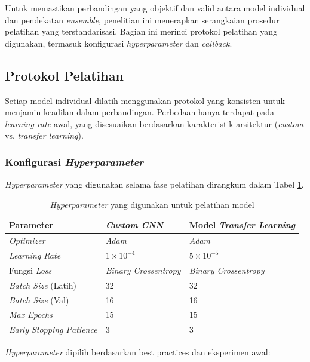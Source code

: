 Untuk memastikan perbandingan yang objektif dan valid antara model individual dan pendekatan \textit{ensemble}, penelitian ini menerapkan serangkaian prosedur pelatihan yang terstandarisasi. Bagian ini merinci protokol pelatihan yang digunakan, termasuk konfigurasi \textit{hyperparameter} dan \textit{callback}.

\subsection{Protokol Pelatihan}

Setiap model individual dilatih menggunakan protokol yang konsisten untuk menjamin keadilan dalam perbandingan. Perbedaan hanya terdapat pada \textit{learning rate} awal, yang disesuaikan berdasarkan karakteristik arsitektur (\textit{custom} vs. \textit{transfer learning}).

\subsubsection{Konfigurasi \textit{Hyperparameter}}
\textit{Hyperparameter} yang digunakan selama fase pelatihan dirangkum dalam Tabel \ref{tab:hyperparameters}.

\begin{table}[h]
\centering
\caption{\textit{Hyperparameter} yang digunakan untuk pelatihan model}
\label{tab:hyperparameters}
\begin{tabular}{|l|l|l|}
\hline
\textbf{Parameter} & \textbf{\textit{Custom CNN}} & \textbf{Model \textit{Transfer Learning}} \\
\hline
\textit{Optimizer} & \textit{Adam} & \textit{Adam} \\
\textit{Learning Rate} & $1 \times 10^{-4}$ & $5 \times 10^{-5}$ \\
Fungsi \textit{Loss} & \textit{Binary Crossentropy} & \textit{Binary Crossentropy} \\
\textit{Batch Size} (Latih) & 32 & 32 \\
\textit{Batch Size} (Val) & 16 & 16 \\
\textit{Max Epochs} & 15 & 15 \\
\textit{Early Stopping Patience} & 3 & 3 \\
\hline
\end{tabular}
\end{table}

\textit{Hyperparameter} dipilih berdasarkan best practices dan eksperimen awal:

